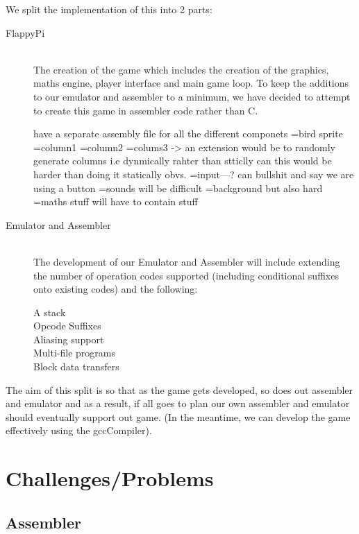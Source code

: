\documentclass[11pt]{article}
\begin{document}
We split the implementation of this into 2 parts:
\begin{description}

\item[FlappyPi] \hfill \\
	The creation of the game which includes the creation of the graphics, maths engine, player interface and main game loop. To keep the additions to our emulator and assembler to a minimum, we have decided to attempt to create this game in assembler code rather than C.
	
	have a separate assembly file for all the different componets
	=bird sprite
	=column1 
	=column2
	=colums3 -> an extension would be to randomly generate columns i.e dynmically rahter than stticlly can this would be harder than doing it statically obvs.
	=input---? can bullshit and say we are using a button
	=sounds will be difficult
	=background but also hard
	=maths stuff will have to contain stuff 
	

\item[Emulator and Assembler] \hfill \\
	The development of our Emulator and Assembler will include extending the number of operation codes supported (including conditional suffixes onto existing codes) and the following:
	\begin{description}
	\item[A stack]
	\item[Opcode Suffixes]
	\item[Aliasing support] 
	\item[Multi-file programs]
	\item[Block data transfers]
	\end{description}
	
\end{description}

The aim of this split is so that as the game gets developed, so does out assembler and emulator and as a result, if all goes to plan our own assembler and emulator should eventually support out game. (In the meantime, we can develop the game effectively using the gccCompiler).


\section{Challenges/Problems}

\subsection{Assembler}
\end{document}
